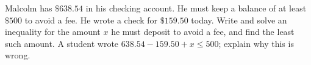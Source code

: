 Malcolm has $\$638.54$ in his checking account. He must keep a balance of at least $\$500$ to avoid a fee. He wrote a check for $\$159.50$ today. Write and solve an inequality for the amount $x$ he must deposit to avoid a fee, and find the least such amount. A student wrote $638.54-159.50+x\le500$; explain why this is wrong.
